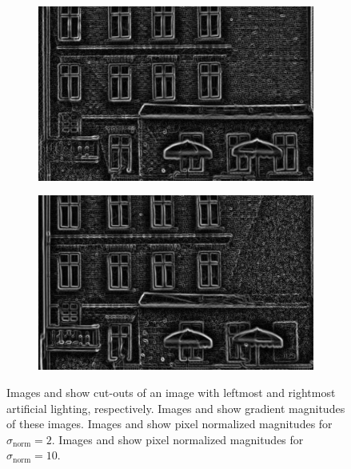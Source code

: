 \documentclass[thesis.tex]{subfiles}
\begin{document}
\begin{figure}[p]
\begin{subfigure}[t]{0.48\textwidth}
        \caption{}
        \label{fig:pixelNormalizationExample6}
    \end{subfigure}
    \begin{subfigure}[t]{0.48\textwidth}
        \includegraphics[width=\textwidth]{img/pixelNormalizationExample7.png}
        \caption{}
        \label{fig:pixelNormalizationExample7}
    \end{subfigure}
    \begin{subfigure}[t]{0.48\textwidth}
        \includegraphics[width=\textwidth]{img/pixelNormalizationExample8.png}
        \caption{}
        \label{fig:pixelNormalizationExample8}
    \end{subfigure}
    \caption{Images  and  show cut-outs of an image with leftmost and rightmost artificial lighting, respectively. Images  and  show gradient magnitudes of these images. Images  and  show pixel normalized magnitudes for $\sigma_\text{norm} = 2$. Images  and  show pixel normalized magnitudes for $\sigma_\text{norm} = 10$.}
    \label{fig:pixelNormalizationExample}
\end{figure}
%
\end{document}
